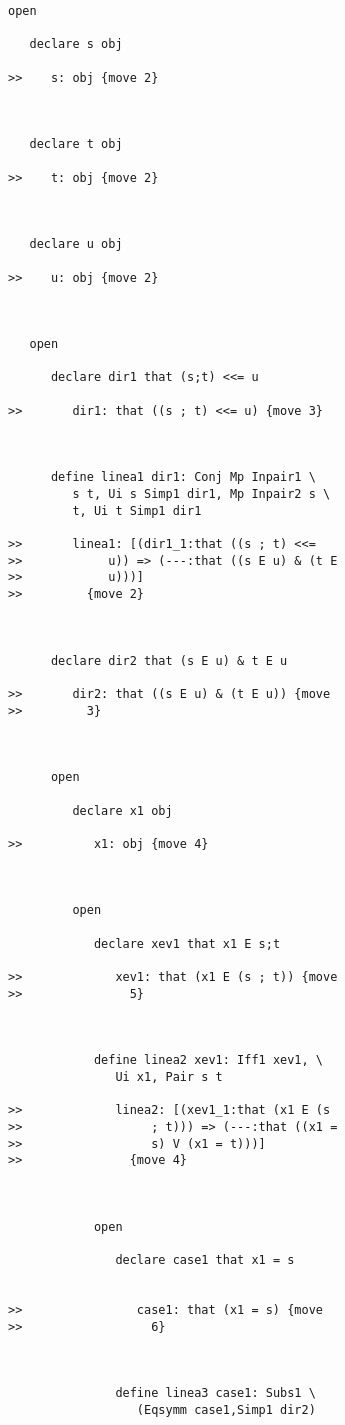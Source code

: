 \documentclass[12pt]{article}
\begin{document}
\begin{verbatim}
open

   declare s obj

>>    s: obj {move 2}



   declare t obj

>>    t: obj {move 2}



   declare u obj

>>    u: obj {move 2}



   open

      declare dir1 that (s;t) <<= u

>>       dir1: that ((s ; t) <<= u) {move 3}



      define linea1 dir1: Conj Mp Inpair1 \
         s t, Ui s Simp1 dir1, Mp Inpair2 s \
         t, Ui t Simp1 dir1

>>       linea1: [(dir1_1:that ((s ; t) <<=
>>            u)) => (---:that ((s E u) & (t E
>>            u)))]
>>         {move 2}



      declare dir2 that (s E u) & t E u

>>       dir2: that ((s E u) & (t E u)) {move
>>         3}



      open

         declare x1 obj

>>          x1: obj {move 4}



         open

            declare xev1 that x1 E s;t

>>             xev1: that (x1 E (s ; t)) {move
>>               5}



            define linea2 xev1: Iff1 xev1, \
               Ui x1, Pair s t

>>             linea2: [(xev1_1:that (x1 E (s
>>                  ; t))) => (---:that ((x1 =
>>                  s) V (x1 = t)))]
>>               {move 4}



            open

               declare case1 that x1 = s


>>                case1: that (x1 = s) {move
>>                  6}



               define linea3 case1: Subs1 \
                  (Eqsymm case1,Simp1 dir2)



\end{verbatim}
\end{document}
